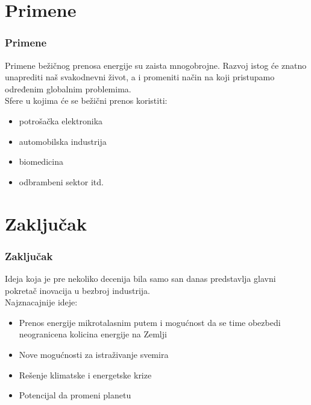 \documentclass[10pt]{beamer}
\begin{document}
\section{Primene}

\begin{frame}\frametitle{Primene}
	Primene bežičnog prenosa energije su zaista mnogobrojne. Razvoj istog će znatno unaprediti naš svakodnevni život, a i promeniti način na koji pristupamo     određenim globalnim problemima. 
	\\Sfere u kojima će se bežični prenos koristiti:\\
	 \begin{itemize}
		\item potrošačka elektronika
		\item automobilska industrija
		\item biomedicina
		\item odbrambeni sektor itd.		 
	\end{itemize}
\end{frame}

\section{Zaključak}

\begin{frame}\frametitle{Zaključak}
	Ideja koja je pre nekoliko decenija bila samo san danas predstavlja glavni pokretač inovacija u bezbroj industrija.\\
	Najznacajnije ideje:\\
	\begin{itemize}
		\item Prenos energije mikrotalasnim putem i mogućnost da se time obezbedi neogranicena kolicina energije na Zemlji 
		\item Nove mogućnosti za istraživanje svemira
		\item Rešenje klimatske i energetske krize
		\item Potencijal da promeni planetu
	\end{itemize}
\end{frame}
\end{document}
